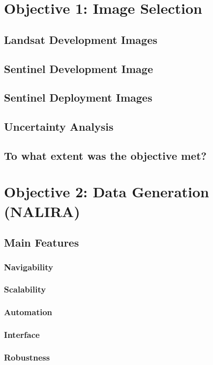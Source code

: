 

\section{Objective 1: Image Selection}
\subsection{Landsat Development Images}

\subsection{Sentinel Development Image}

\subsection{Sentinel Deployment Images}

\subsection{Uncertainty Analysis}

\subsection{To what extent was the objective met?}


\section{Objective 2: Data Generation (NALIRA)}
\subsection{Main Features}
\subsubsection{Navigability}
\subsubsection{Scalability}
\subsubsection{Automation}
\subsubsection{Interface}
\subsubsection{Robustness}

